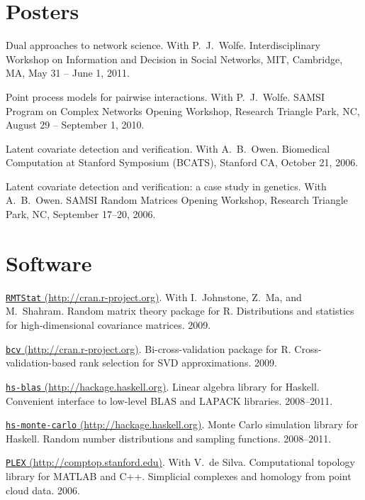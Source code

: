 \documentclass[10pt,letterpaper]{article}
\renewenvironment{itemize}{
  \begin{list}{}{
    \setlength{\leftmargin}{1.5em}
    \setlength{\itemsep}{0.25em}
    \setlength{\parskip}{0pt}
    \setlength{\parsep}{0.25em}
  }
}{
  \end{list}
}
\begin{document}
\section*{Posters}
\begin{itemize}
\item Dual approaches to network science.
  With P.~J.~Wolfe.
  Interdisciplinary Workshop on Information and Decision in Social Networks,
  MIT, Cambridge, MA,
  May 31 -- June 1, 2011.

\item Point process models for pairwise interactions.
  With P.~J.~Wolfe.
  SAMSI Program on Complex Networks Opening Workshop,
  Research Triangle Park, NC,
  August 29 -- September 1, 2010.

\item Latent covariate detection and verification.
  With A.~B.~Owen.
  Biomedical Computation at Stanford Symposium (BCATS),
  Stanford CA,
  October 21, 2006.

\item Latent covariate detection and verification: a case study in genetics.
  With A.~B.~Owen.
  SAMSI Random Matrices Opening Workshop,
  Research Triangle Park, NC,
  September 17--20, 2006.
\end{itemize}


\section*{Software}
\begin{itemize}
\item \href{http://cran.r-project.org/web/packages/RMTstat/index.html}
{\texttt{RMTStat} (http://cran.r-project.org)}.
With I.~Johnstone, Z.~Ma, and M.~Shahram.
Random matrix theory package for R.
Distributions and statistics for high-dimensional covariance matrices.
2009.

\item \href{http://cran.r-project.org/web/packages/bcv/index.html}
{\texttt{bcv} (http://cran.r-project.org)}.
Bi-cross-validation package for R.
Cross-validation-based rank selection for SVD approximations.
2009.

\item \href{http://hackage.haskell.org/cgi-bin/hackage-scripts/package/blas}
{\texttt{hs-blas} (http://hackage.haskell.org)}.
Linear algebra library for Haskell.
Convenient interface to low-level BLAS and LAPACK libraries.
2008--2011.

\item \href{http://hackage.haskell.org/cgi-bin/hackage-scripts/package/monte-carlo}
{\texttt{hs-monte-carlo} (http://hackage.haskell.org)}.
Monte Carlo simulation library for Haskell.
Random number distributions and sampling functions.
2008--2011.

\item \href{http://comptop.stanford.edu/programs/plex.html}
{\texttt{PLEX} (http://comptop.stanford.edu)}.
With V.\ de Silva.
Computational topology library for \textsc{MATLAB} and C++.
Simplicial complexes and homology from point cloud data.
2006.

\end{itemize}
\end{document}
